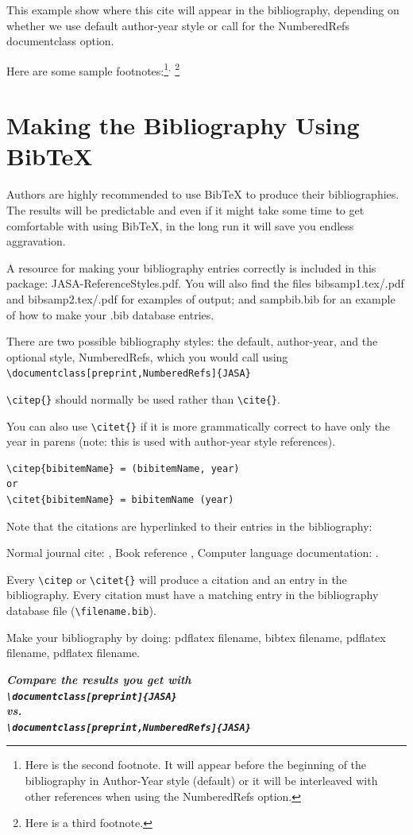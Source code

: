 \documentclass[reprint]{JASA}
\begin{document}
This example show where this cite \citep{booksamp1} will appear in the
bibliography,
depending on whether we use default author-year style
or call for the NumberedRefs documentclass option.

Here are some sample footnotes:\footnote{Here is the second footnote.
It will appear before the beginning of the bibliography in Author-Year
style (default) or it will be 
 interleaved with other references when using the Numbered\-Refs
 option.}$^,$%
\footnote{Here is a third footnote.}


\section{Making the Bibliography Using BibTeX}
Authors are highly  recommended to use BibTeX to produce their
bibliographies. The results will be predictable and even if
it might take some time to get comfortable with  using BibTeX,
in the long run it will save you endless aggravation.

A resource for making your bibliography entries
correctly is included in this package: 
JASA-ReferenceStyles.pdf. You will also find
the files
bibsamp1.tex/.pdf and bibsamp2.tex/.pdf
for examples of output; and sampbib.bib for an example of
how to make your .bib database entries.

There are two possible bibliography styles: the default, author-year,
and the optional style, Numbered\-Refs, which you would call using\\
{\verb+\documentclass[preprint,NumberedRefs]{JASA}+ }

\verb+\citep{}+ should normally be used rather than \verb+\cite{}+.



You can also use \verb+\citet{}+ if it is more grammatically correct
to have only the year in parens (note: this is used with author-year style references).

\begin{verbatim}
\citep{bibitemName} = (bibitemName, year)
or
\citet{bibitemName} = bibitemName (year)
\end{verbatim}

Note that the citations are hyperlinked to their entries in the
bibliography:

Normal journal cite: \citep{joursamp1},
 Book reference \citet{booksamp1}, 
Computer language documentation:
\citep{sampcode2}.

Every \verb+\citep+  or \verb+\citet{}+ will produce a citation and an entry in the
bibliography. Every citation must have a matching entry in the
bibliography
database file (\verb+\filename.bib+).

Make your bibliography by doing: pdflatex filename,  bibtex filename,
pdflatex filename, pdflatex filename.

{\bfseries\itshape
Compare the results you get with\\
{\verb+\documentclass[preprint]{JASA}+ }\\
vs.\\
{\verb+\documentclass[preprint,NumberedRefs]{JASA}+ }
}


\end{document}
